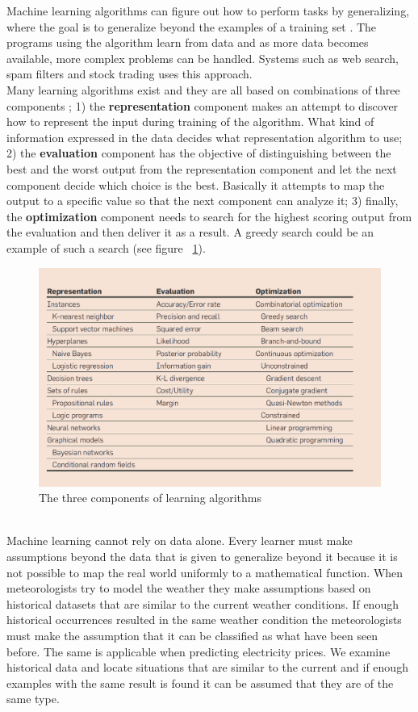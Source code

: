Machine learning algorithms can figure out how to perform tasks by generalizing, where the goal is to generalize beyond the examples of a training set \cite{18}. The programs using the algorithm learn from data and as more data becomes available, more complex problems can be handled. Systems such as web search, spam filters and stock trading uses this approach.
\\[0.5cm]
Many learning algorithms exist and they are all based on combinations of three components \cite{18}; 1) the \textbf{representation} component makes an attempt to discover how to represent the input during training of the algorithm. What kind of information expressed in the data decides what representation algorithm to use; 2) the \textbf{evaluation} component has the objective of distinguishing between the best and the worst output from the representation component and let the next component decide which choice is the best. Basically it attempts to map the output to a specific value so that the next component can analyze it; 3) finally, the \textbf{optimization} component needs to search for the highest scoring output from the evaluation and then deliver it as a result. A greedy search could be an example of such a search (see figure ~\ref{fig:threeComponents}).
\begin{figure}[h!]
\centering
\includegraphics[width=0.6\linewidth,natwidth=898,natheight=587]{billeder/Table1-TheComponentsOfLearningAlgorithms.png}
\caption{The three components of learning algorithms \cite{18}}
\label{fig:threeComponents}
\end{figure}
\\[0.5cm] 
Machine learning cannot rely on data alone. Every learner must make assumptions beyond the data that is given to generalize beyond it \cite{18} because it is not possible to map the real world uniformly to a mathematical function. When meteorologists try to model the weather they make assumptions based on historical datasets that are similar to the current weather conditions. If enough historical occurrences resulted in the same weather condition the meteorologists must make the assumption that it can be classified as what have been seen before. The same is applicable when predicting electricity prices. We examine historical data and locate situations that are similar to the current and if enough examples with the same result is found it can be assumed that they are of the same type.
